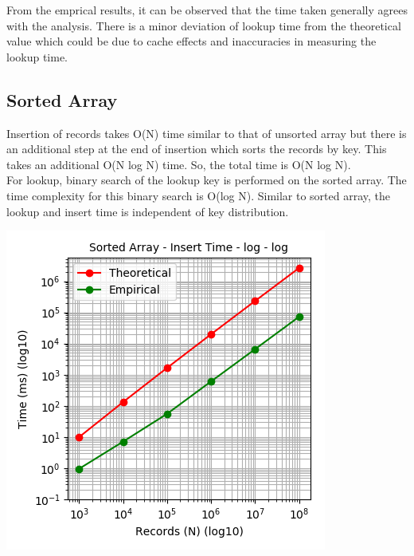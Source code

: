 \documentclass[11pt,a4paper,oneside]{article}
\begin{document}
    From the emprical results, it can be observed that the time taken generally agrees with the analysis. There is a minor deviation of lookup time from the theoretical value which could be due to cache effects and inaccuracies in measuring the lookup time.
	
	\subsection{Sorted Array}
	Insertion of records takes O(N) time similar to that of unsorted array but there is an additional step at the end of insertion which sorts the records by key. This takes an additional O(N log N) time. So, the total time is O(N log N). \\
	\newline
	For lookup, binary search of the lookup key is performed on the sorted array. The time complexity for this binary search is O(log N). Similar to sorted array, the lookup and insert time is independent of key distribution. 
	
	\begin{center}
		\includegraphics[scale=0.6]{5.png}		
	\end{center}
	
\end{document}
